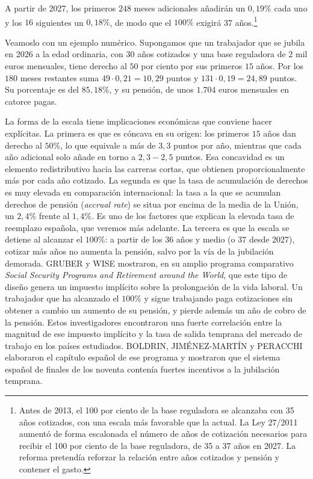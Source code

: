 \documentclass[10pt,a4paper]{article}
\begin{document}
A partir de 2027, los primeros $248$ meses adicionales añadirán un $0,19\%$ cada uno y los $16$ siguientes un $0,18\%$, de modo que el $100\%$ exigirá 37 años.\footnote{%
    Antes de 2013, el 100 por ciento de la base reguladora se alcanzaba con 35 años cotizados, con una escala más favorable que la actual. La Ley 27/2011 aumentó de forma escalonada el número de años de cotización necesarios para recibir el 100 por ciento de la base reguladora, de 35 a 37 años en 2027. La reforma pretendía reforzar la relación entre años cotizados y pensión y contener el gasto.
}

Veamoslo con un ejemplo numérico. Supongamos que un trabajador que se jubila en 2026 a la edad ordinaria, con $30$ años cotizados y una base reguladora de $2$ mil euros mensuales, tiene derecho al $50$ por ciento por sus primeros $15$ años. Por los $180$ meses restantes suma $49 \cdot 0,21 = 10,29$ puntos y $131 \cdot 0,19 = 24,89$ puntos. Su porcentaje es del $85,18\%$, y su pensión, de unos $1{.}704$ euros mensuales en catorce pagas.

La forma de la escala tiene implicaciones económicas que conviene hacer explícitas. La primera es que es cóncava en su origen: los primeros $15$ años dan derecho al $50\%$, lo que equivale a más de $3,3$ puntos por año, mientras que cada año adicional solo añade en torno a $2,3-2,5$ puntos. Esa concavidad es un elemento redistributivo hacia las carreras cortas, que obtienen proporcionalmente más por cada año cotizado. La segunda es que la tasa de acumulación de derechos es muy elevada en comparación internacional: la tasa a la que se acumulan derechos de pensión (\textit{accrual rate}) se situa por encima de la media de la Unión, un $2,4\%$ frente al $1,4\%$. Es uno de los factores que explican la elevada tasa de reemplazo española, que veremos más adelante. La tercera es que la escala se detiene al alcanzar el $100\%$: a partir de los $36$ años y medio (o $37$ desde 2027), cotizar más años no aumenta la pensión, salvo por la vía de la jubilación demorada. GRUBER y WISE mostraron, en su amplio programa comparativo \textit{Social Security Programs and Retirement around the World}, que este tipo de diseño genera un impuesto implícito sobre la prolongación de la vida laboral. Un trabajador que ha alcanzado el $100\%$ y sigue trabajando paga cotizaciones sin obtener a cambio un aumento de su pensión, y pierde además un año de cobro de la pensión. Estos investigadores encontraron una fuerte correlación entre la magnitud de ese impuesto implícito y la tasa de salida temprana del mercado de trabajo en los países estudiados. BOLDRIN, JIMÉNEZ-MARTÍN y PERACCHI elaboraron el capítulo español de ese programa y mostraron que el sistema español de finales de los noventa contenía fuertes incentivos a la jubilación temprana.
\end{document}
